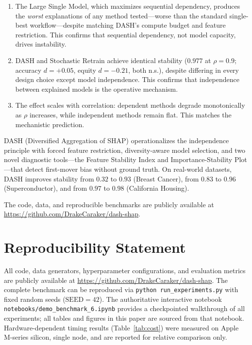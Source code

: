 \documentclass[11pt]{article}
\newcommand{\dash}{\textsc{DASH}}
\newcommand{\rhovar}{\rho}
\begin{document}
\begin{enumerate}
  \item The Large Single Model, which maximizes sequential dependency,
    produces the \emph{worst} explanations of any method tested---worse
    than the standard single-best workflow---despite matching \dash{}'s
    compute budget and feature restriction. This confirms that
    sequential dependency, not model capacity, drives instability.
  \item \dash{} and Stochastic Retrain achieve identical
    stability ($0.977$ at $\rhovar = 0.9$; accuracy $d = +0.05$,
    equity $d = -0.21$, both n.s.),
    despite differing in every design choice except model independence.
    This confirms that independence between explained models is the
    operative mechanism.
  \item The effect scales with correlation: dependent methods degrade
    monotonically as $\rhovar$ increases, while independent methods
    remain flat. This matches the mechanistic prediction.
\end{enumerate}

\dash{} (Diversified Aggregation of SHAP) operationalizes the
independence principle with forced feature restriction, diversity-aware
model selection, and two novel diagnostic tools---the Feature Stability
Index and Importance-Stability Plot---that detect first-mover bias
without ground truth. On real-world datasets, \dash{} improves stability
from $0.32$ to $0.93$ (Breast Cancer), from $0.83$ to $0.96$
(Superconductor), and from $0.97$ to $0.98$ (California Housing).

The code, data, and reproducible benchmarks are publicly available at
\url{https://github.com/DrakeCaraker/dash-shap}.


\section*{Reproducibility Statement}

All code, data generators, hyperparameter configurations, and evaluation
metrics are publicly available at
\url{https://github.com/DrakeCaraker/dash-shap}. The complete benchmark
can be reproduced via \texttt{python run\_experiments.py} with fixed
random seeds ($\text{SEED} = 42$). The authoritative interactive
notebook \texttt{notebooks/demo\_benchmark\_6.ipynb} provides a
checkpointed walkthrough of all experiments; all tables and figures in
this paper are sourced from that notebook. Hardware-dependent timing
results (Table~\ref{tab:cost}) were measured on Apple M-series silicon,
single node, and are reported for relative comparison only.
\end{document}
